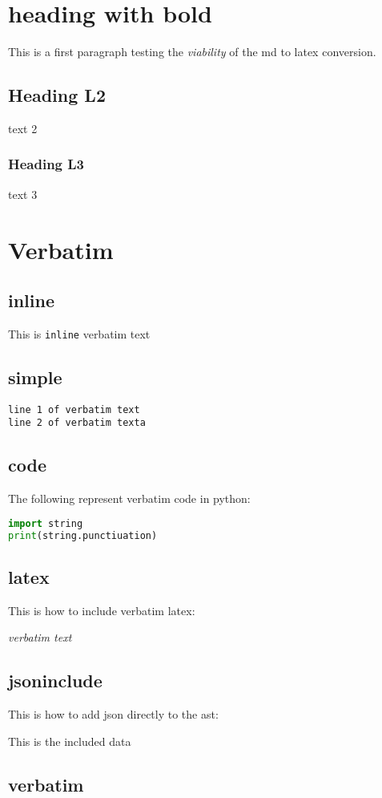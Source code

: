 \section{heading with \textbf{bold}}
This is a first paragraph testing the \emph{viability} of
the md to latex conversion.
\subsection{Heading L2}
text 2 
\subsubsection{Heading L3}
text 3
\section{Verbatim}
\subsection{inline}
This is \lstinline!inline! verbatim text
\subsection{simple}

\begin{verbatim}
line 1 of verbatim text
line 2 of verbatim texta
\end{verbatim}
\subsection{code}
The following represent verbatim code in python:


\begin{lstlisting}[language=python]
import string
print(string.punctiuation)
\end{lstlisting}
\subsection{latex}
This is how to include verbatim latex:

\emph{verbatim text}
\subsection{jsoninclude}
This is how to add json directly to the ast:

This is the included data
\subsection{verbatim}

